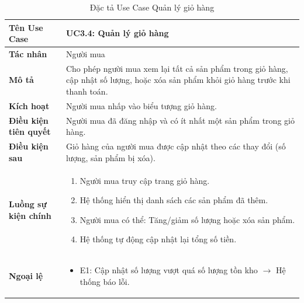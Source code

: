 \begin{table}[H]
\centering
\begin{tabularx}{\textwidth}{|l|X|}
\hline
\textbf{Tên Use Case} & \textbf{UC3.4: Quản lý giỏ hàng} \\ \hline
\textbf{Tác nhân} & Người mua \\ \hline
\textbf{Mô tả} & Cho phép người mua xem lại tất cả sản phẩm trong giỏ hàng, cập nhật số lượng, hoặc xóa sản phẩm khỏi giỏ hàng trước khi thanh toán. \\ \hline
\textbf{Kích hoạt} & Người mua nhấp vào biểu tượng giỏ hàng. \\ \hline
\textbf{Điều kiện tiên quyết} & Người mua đã đăng nhập và có ít nhất một sản phẩm trong giỏ hàng. \\ \hline
\textbf{Điều kiện sau} & Giỏ hàng của người mua được cập nhật theo các thay đổi (số lượng, sản phẩm bị xóa). \\ \hline
\textbf{Luồng sự kiện chính} & 
\begin{enumerate}
    \item Người mua truy cập trang giỏ hàng.
    \item Hệ thống hiển thị danh sách các sản phẩm đã thêm.
    \item Người mua có thể: Tăng/giảm số lượng hoặc xóa sản phẩm.
    \item Hệ thống tự động cập nhật lại tổng số tiền.
\end{enumerate} \\ \hline
\textbf{Ngoại lệ} & 
\begin{itemize}
    \item E1: Cập nhật số lượng vượt quá số lượng tồn kho $\rightarrow$ Hệ thống báo lỗi.
\end{itemize} \\ \hline
\end{tabularx}
\caption{Đặc tả Use Case Quản lý giỏ hàng}
\end{table}

